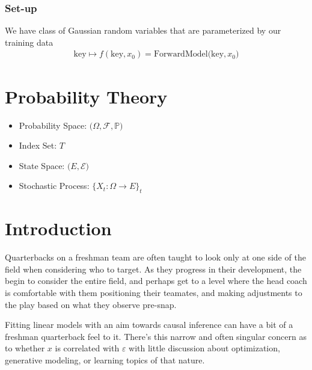 \documentclass{article}
\begin{document}
\subsubsection{Set-up}
We have class of Gaussian random variables that are parameterized by our training data 
\begin{align*}
\textrm{key} \longmapsto f(\textrm{key}, x_0) = \textrm{ForwardModel(key}, x_0)
\end{align*}
\section{Probability Theory}
 
\begin{itemize}
    \item Probability Space: $\big(\Omega, \mathcal{F}, \mathbb{P}\big)$
    \item Index Set: $T$
    \item State Space: $\big(E, \mathcal{E}\big)$
    \item Stochastic Process: $\{X_t: \Omega \rightarrow E \}_t$
\end{itemize}
\newpage 
\section{Introduction}
Quarterbacks on a freshman team are often taught to look only at one side of the field when considering who to target. As they progress in their development, the begin to consider the entire field, and perhaps get to a level where the head coach is comfortable with them positioning their teamates, and making adjustments to the play based on what they observe pre-snap.\par 

Fitting linear models with an aim towards causal inference can have a bit of a freshman quarterback feel to it. There's this narrow and often singular concern as to whether $x$ is correlated with $\varepsilon$ with  little discussion about optimization, generative modeling, or learning topics of that nature.
\end{document}
